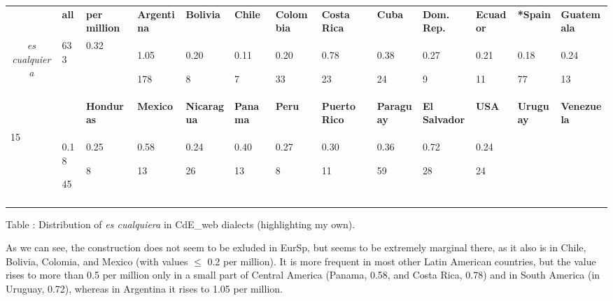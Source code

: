 \documentclass[output=paper]{langscibook}
\begin{document}
\begin{tabularx}{\textwidth}{XXXXXXXXXXXXX}

\lsptoprule

\multicolumn{1}{c}{\textbf{context}} & \textbf{all} & \textbf{per} \textbf{million} & \textbf{Argentina} & \textbf{Bolivia} & \textbf{Chile} & \textbf{Colombia} & \textbf{Costa} \textbf{Rica} & \textbf{Cuba} & \textbf{Dom.} \textbf{Rep.} & \textbf{Ecuador} & \textbf{*Spain} & \textbf{Guatemala}\\
\multicolumn{1}{c}{ \textit{es cualquiera}} & 633 & 0.32 & { 1.05}

 178 & { 0.20}

 8 & { 0.11}

 7 & { 0.20}

 33 & { 0.78}

 23 & { 0.38}

 24 & { 0.27}

 9 & { 0.21}

 11 & { 0.18}

 77 & { 0.24}

 13\\
&  & \textbf{Honduras} & \textbf{Mexico} & \textbf{Nicaragua} & \textbf{Panama} & \textbf{Peru} & \textbf{Puerto} \textbf{Rico} & \textbf{Paraguay} & \textbf{El} \textbf{Salvador} & \textbf{USA} & \textbf{Uruguay} & \textbf{Venezuela}\\

 15 & { 0.18}

 45 & { 0.25}

 8 & { 0.58}

 13 & { 0.24}

 26 & { 0.40}

 13 & { 0.27}

 8 & { 0.30}

 11 & { 0.36}

 59 & { 0.72}

 28 & { 0.24}

 24\\
\lspbottomrule
\end{tabularx}
\begin{styletablecaption}
Table : Distribution of \textit{es cualquiera} in CdE\_web dialects (highlighting my own).
\end{styletablecaption}

As we can see, the construction does not seem to be exluded in EurSp, but seems to be extremely marginal there, as it also is in Chile, Bolivia, Colomia, and Mexico (with values ${\leq}$ 0.2 per million). It is more frequent in most other Latin American countries, but the value rises to more than 0.5 per million only in a small part of Central America (Panama, 0.58, and Costa Rica, 0.78) and in South America (in Uruguay, 0.72), whereas in Argentina it rises to 1.05 per million.
\end{document}
